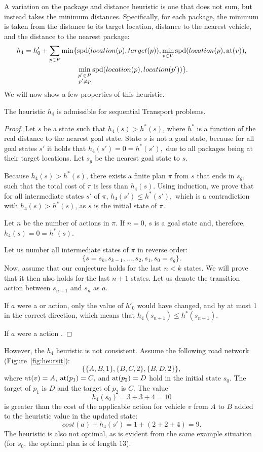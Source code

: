 A variation on the package and distance heuristic
is one that does not sum, but instead takes
the minimum distances.
Specifically, for each package, the minimum
is taken from the distance to its target location,
distance to the nearest vehicle,
and the distance to the nearest package:
\begin{align*}
h_4 = h'_0 + \sum_{p \in P} \min\lbrace
&\textrm{spd}(location(p), target(p)),
\min_{v \in V} \textrm{spd}(location(p), \textrm{at}(v)),\\
&\min_{\substack{p' \in P\\p' \neq p}} \textrm{spd}(location(p), location(p'))\rbrace.
\end{align*}
We will now show a few properties of this heuristic.
\begin{thm}
The heuristic $h_4$ is admissible for sequential Transport problems.
\end{thm}
\begin{proof}
Let $s$ be a state such that $h_4(s) > h^*(s)$,
where $h^*$ is a function of the real distance to the nearest goal state.
State $s$ is not a goal state, because for all goal states $s'$
it holds that
$h_4(s') = 0 = h^*(s'),$ due to all packages being at their target locations.
Let $s_g$ be the nearest goal state to $s$.

Because $h_4(s) > h^*(s)$, there exists a finite plan $\pi$ from $s$ that ends in $s_g$,
such that the total cost of $\pi$ is less than $h_4(s)$.
Using induction, we prove that for all intermediate states $s'$ of $\pi$,
$h_4(s') \leq h^*(s'),$ which is a contradiction with $h_4(s) > h^*(s)$,
as $s$ is the initial state of $\pi$.

Let $n$ be the number of actions in $\pi$.
If $n=0$, $s$ is a goal state and, therefore, $h_4(s) = 0 = h^*(s)$.

Let us number all intermediate states of $\pi$ in reverse order: $$\{s = s_k, s_{k-1}, \ldots, s_2, s_1, s_0 = s_g\}.$$
Now, assume that our conjecture holds for the last $n < k$ states.
We will prove that it then also holds for the last $n+1$ states.
Let us denote the transition action between $s_{n+1}$ and $s_{n}$ as $a$.

If $a$ were a \pickup{} or \drop{} action, only the value of $h'_0$
would have changed, and by at most 1 in the correct direction,
which means that $h_4(s_{n+1}) \leq h^*(s_{n+1}).$

If $a$ were a \drive{} action
.
\end{proof}

However, the $h_4$ heuristic is not consistent. Assume the following road network (Figure~\ref{fig:heursit}):
$$\{\{A, B, 1\}, \{B, C, 2\}, \{B, D, 2\}\},$$
where $\textrm{at}(v) = A$, $\textrm{at}(p_1) = C,$ and $\textrm{at}(p_2) = D$
hold in the initial state $s_0$.
The target of $p_1$ is $D$ and the target of $p_2$ is $C$.
The value
$$h_4(s_0) = 3+3+4 = 10$$ is greater than the cost
of the applicable \drive{} action for vehicle $v$ from $A$ to $B$
added to the heuristic value in the updated state:
$$cost(a) + h_4(s') = 1 + (2+2+4) = 9.$$
The heuristic is also not optimal, as is evident from the same
example situation (for $s_0$, the optimal plan is of length $13$).

